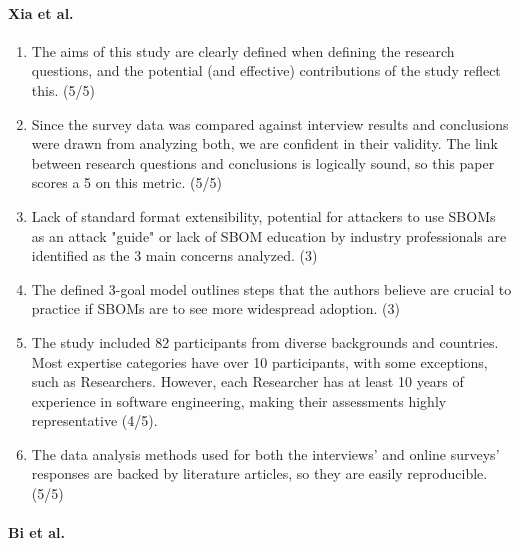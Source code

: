 \paragraph{Xia et al. \cite{article:sbom-study}}

\begin{enumerate}
    \item The aims of this study are clearly defined when defining the research questions, and the potential (and effective) contributions of the study reflect this. (5/5)
    \item Since the survey data was compared against interview results and conclusions were drawn from analyzing both, we are confident in their validity. The link between research questions and conclusions is logically sound, so this paper scores a 5 on this metric. (5/5)
    \item Lack of standard format extensibility, potential for attackers to use SBOMs as an attack "guide" or lack of SBOM education by industry professionals are identified as the 3 main concerns analyzed. (3)
    \item The defined 3-goal model outlines steps that the authors believe are crucial to practice if SBOMs are to see more widespread adoption. (3)
    \item The study included 82 participants from diverse backgrounds and countries. Most expertise categories have over 10 participants, with some exceptions, such as Researchers. However, each Researcher has at least 10 years of experience in software engineering, making their assessments highly representative (4/5).
    \item The data analysis methods used for both the interviews' and online surveys' responses are backed by literature articles, so they are easily reproducible. (5/5)
\end{enumerate}

\paragraph{Bi et al. \cite{article:sboms-issues-solutions}}

